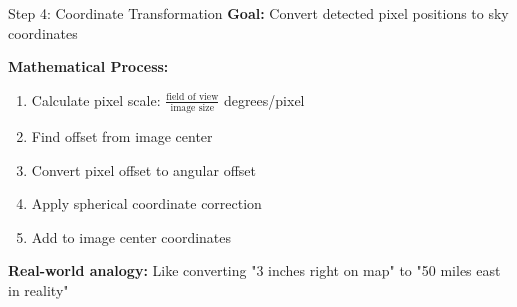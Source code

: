 \documentclass[aspectratio=169]{beamer}
\begin{document}
\begin{frame}{Step 4: Coordinate Transformation}
\textbf{Goal:} Convert detected pixel positions to sky coordinates

\begin{center}
\end{center}

\textbf{Mathematical Process:}
\begin{enumerate}
\item Calculate pixel scale: $\frac{\text{field of view}}{\text{image size}}$ degrees/pixel
\item Find offset from image center
\item Convert pixel offset to angular offset  
\item Apply spherical coordinate correction
\item Add to image center coordinates
\end{enumerate}

\textbf{Real-world analogy:} \textcolor{starblue}{Like converting "3 inches right on map" to "50 miles east in reality"}
\end{frame}
\end{document}

